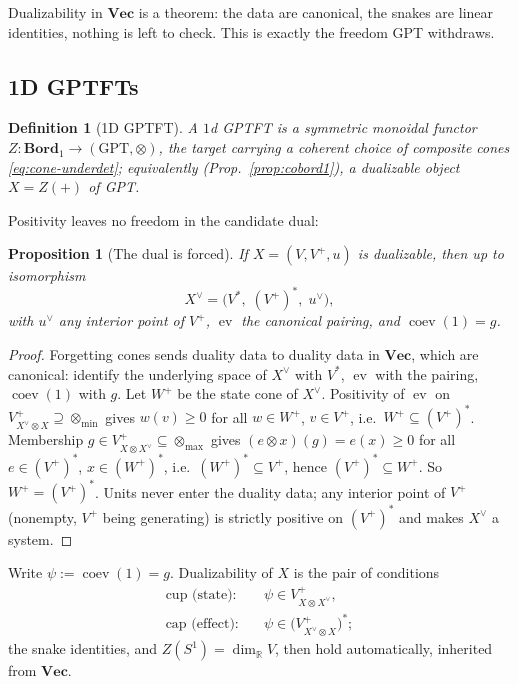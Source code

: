 \documentclass[prl,aps,10pt,superscriptaddress, floatfix]{revtex4-2}
\newtheorem{prop}{Proposition}
\newtheorem*{defi}{Definition}
\begin{document}
Dualizability in $\mathbf{Vec}$ is a theorem: the data are canonical, the snakes are linear identities, nothing is left to check. This is exactly the freedom GPT withdraws.

\subsection{1D GPTFTs}

\begin{defi}[1D GPTFT]
A \emph{$1$d GPTFT} is a symmetric monoidal functor $Z:\mathbf{Bord}_1\to(\mathrm{GPT},\otimes)$, the target carrying a coherent choice of composite cones \eqref{eq:cone-underdet}; equivalently (Prop.~\ref{prop:cobord1}), a dualizable object $X=Z(+)$ of GPT.
\end{defi}

Positivity leaves no freedom in the candidate dual:

\begin{prop}[The dual is forced]\label{prop:dualforced}
If $X=(V,V^+,u)$ is dualizable, then up to isomorphism
\[
X^\vee=\big(V^*,\;(V^+)^*,\;u^\vee\big),
\]
with $u^\vee$ any interior point of $V^+$, $\operatorname{ev}$ the canonical pairing, and $\operatorname{coev}(1)=g$.
\end{prop}

\begin{proof}
Forgetting cones sends duality data to duality data in $\mathbf{Vec}$, which are canonical: identify the underlying space of $X^\vee$ with $V^*$, $\operatorname{ev}$ with the pairing, $\operatorname{coev}(1)$ with $g$. Let $W^+$ be the state cone of $X^\vee$. Positivity of $\operatorname{ev}$ on $V^+_{X^\vee\otimes X}\supseteq\otimes_{\min}$ gives $w(v)\ge0$ for all $w\in W^+$, $v\in V^+$, i.e.\ $W^+\subseteq(V^+)^*$. Membership $g\in V^+_{X\otimes X^\vee}\subseteq\otimes_{\max}$ gives $(e\otimes x)(g)=e(x)\ge0$ for all $e\in(V^+)^*$, $x\in(W^+)^*$, i.e.\ $(W^+)^*\subseteq V^+$, hence $(V^+)^*\subseteq W^+$. So $W^+=(V^+)^*$. Units never enter the duality data; any interior point of $V^+$ (nonempty, $V^+$ being generating) is strictly positive on $(V^+)^*$ and makes $X^\vee$ a system.
\end{proof}

Write $\psi:=\operatorname{coev}(1)=g$. Dualizability of $X$ is the pair of conditions
\begin{align}
\text{cup (state):}&\quad \psi\in V^+_{X\otimes X^\vee},\label{eq:cup}\\
\text{cap (effect):}&\quad \psi\in\big(V^+_{X^\vee\otimes X}\big)^{*};\label{eq:cap}
\end{align}
the snake identities, and $Z(S^1)=\dim_{\mathbb R}V$, then hold automatically, inherited from $\mathbf{Vec}$.
\end{document}
